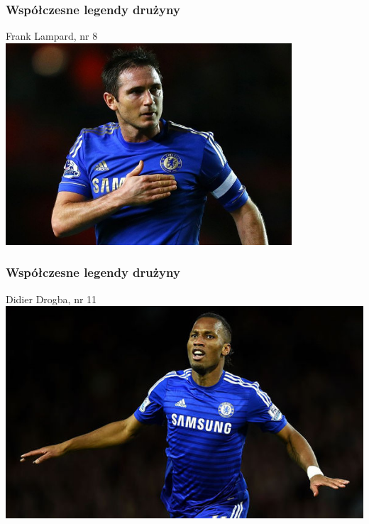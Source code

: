 \documentclass[]{beamer}
\begin{document}
\frame
{
	\frametitle{Współczesne legendy drużyny}
	\begin{block}
		{Frank Lampard, nr 8}
		\centering
		\includegraphics[width=0.8\textwidth]{fl.jpg}
	\end{block}
}
\frame
{
	\frametitle{Współczesne legendy drużyny}
	\begin{block}
		{Didier Drogba, nr 11}
		\centering
		\includegraphics[width=1\textwidth]{dd.jpg}
	\end{block}
}
\end{document}
